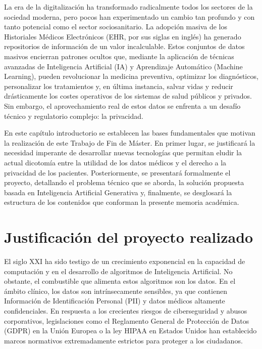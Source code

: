
La era de la digitalización ha transformado radicalmente todos los sectores de la sociedad moderna, pero pocos han experimentado un cambio tan profundo y con tanto potencial como el sector sociosanitario. La adopción masiva de los Historiales Médicos Electrónicos (EHR, por sus siglas en inglés) ha generado repositorios de información de un valor incalculable. Estos conjuntos de datos masivos encierran patrones ocultos que, mediante la aplicación de técnicas avanzadas de Inteligencia Artificial (IA) y Aprendizaje Automático (Machine Learning), pueden revolucionar la medicina preventiva, optimizar los diagnósticos, personalizar los tratamientos y, en última instancia, salvar vidas y reducir drásticamente los costes operativos de los sistemas de salud públicos y privados. Sin embargo, el aprovechamiento real de estos datos se enfrenta a un desafío técnico y regulatorio complejo: la privacidad.

En este capítulo introductorio se establecen las bases fundamentales que motivan la realización de este Trabajo de Fin de Máster. En primer lugar, se justificará la necesidad imperante de desarrollar nuevas tecnologías que permitan eludir la actual dicotomía entre la utilidad de los datos médicos y el derecho a la privacidad de los pacientes. Posteriormente, se presentará formalmente el proyecto, detallando el problema técnico que se aborda, la solución propuesta basada en Inteligencia Artificial Generativa y, finalmente, se desglosará la estructura de los contenidos que conforman la presente memoria académica.

\setcounter{section}{0}
\section{Justificación del proyecto realizado}

El siglo XXI ha sido testigo de un crecimiento exponencial en la capacidad de computación y en el desarrollo de algoritmos de Inteligencia Artificial. No obstante, el combustible que alimenta estos algoritmos son los datos. En el ámbito clínico, los datos son intrínsecamente sensibles, ya que contienen Información de Identificación Personal (PII) y datos médicos altamente confidenciales. En respuesta a los crecientes riesgos de ciberseguridad y abusos corporativos, legislaciones como el Reglamento General de Protección de Datos (GDPR) en la Unión Europea o la ley HIPAA en Estados Unidos han establecido marcos normativos extremadamente estrictos para proteger a los ciudadanos.

